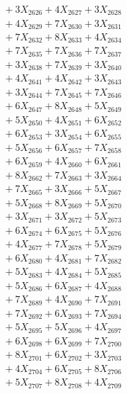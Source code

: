 \documentclass[a4paper,10pt]{article}
\begin{document}
{\begin{align}
&\;  + 3 X_{2626} + 4 X_{2627} + 3 X_{2628} \\[0.3ex]
&\;  + 4 X_{2629} + 7 X_{2630} + 3 X_{2631} \\[0.3ex]
&\;  + 7 X_{2632} + 8 X_{2633} + 4 X_{2634} \\[0.3ex]
&\;  + 7 X_{2635} + 7 X_{2636} + 7 X_{2637} \\[0.3ex]
&\;  + 3 X_{2638} + 7 X_{2639} + 3 X_{2640} \\[0.3ex]
&\;  + 4 X_{2641} + 4 X_{2642} + 3 X_{2643} \\[0.3ex]
&\;  + 3 X_{2644} + 7 X_{2645} + 7 X_{2646} \\[0.3ex]
&\;  + 6 X_{2647} + 8 X_{2648} + 5 X_{2649} \\[0.5ex]\allowbreak
&\;  + 5 X_{2650} + 4 X_{2651} + 6 X_{2652} \\[0.3ex]
&\;  + 6 X_{2653} + 3 X_{2654} + 6 X_{2655} \\[0.3ex]
&\;  + 5 X_{2656} + 6 X_{2657} + 7 X_{2658} \\[0.3ex]
&\;  + 6 X_{2659} + 4 X_{2660} + 6 X_{2661} \\[0.3ex]
&\;  + 8 X_{2662} + 7 X_{2663} + 3 X_{2664} \\[0.3ex]
&\;  + 7 X_{2665} + 3 X_{2666} + 5 X_{2667} \\[0.3ex]
&\;  + 5 X_{2668} + 8 X_{2669} + 5 X_{2670} \\[0.3ex]
&\;  + 3 X_{2671} + 3 X_{2672} + 5 X_{2673} \\[0.3ex]
&\;  + 6 X_{2674} + 6 X_{2675} + 5 X_{2676} \\[0.3ex]
&\;  + 4 X_{2677} + 7 X_{2678} + 5 X_{2679} \\[0.5ex]\allowbreak
&\;  + 6 X_{2680} + 4 X_{2681} + 7 X_{2682} \\[0.3ex]
&\;  + 5 X_{2683} + 4 X_{2684} + 5 X_{2685} \\[0.3ex]
&\;  + 5 X_{2686} + 6 X_{2687} + 4 X_{2688} \\[0.3ex]
&\;  + 7 X_{2689} + 4 X_{2690} + 7 X_{2691} \\[0.3ex]
&\;  + 7 X_{2692} + 6 X_{2693} + 7 X_{2694} \\[0.3ex]
&\;  + 5 X_{2695} + 5 X_{2696} + 4 X_{2697} \\[0.3ex]
&\;  + 6 X_{2698} + 6 X_{2699} + 7 X_{2700} \\[0.3ex]
&\;  + 8 X_{2701} + 6 X_{2702} + 3 X_{2703} \\[0.3ex]
&\;  + 4 X_{2704} + 6 X_{2705} + 8 X_{2706} \\[0.3ex]
&\;  + 5 X_{2707} + 8 X_{2708} + 4 X_{2709} \\[0.5ex]\allowbreak

\end{align}}
\end{document}
